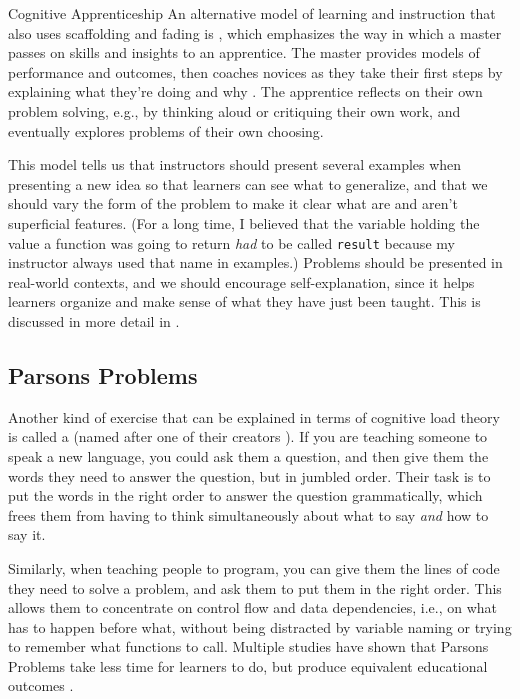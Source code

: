 \begin{aside}{Cognitive Apprenticeship}
  An alternative model of learning and instruction that also uses
  scaffolding and fading is
  ,
  which emphasizes the way in which a master passes on skills and
  insights to an apprentice. The master provides models of performance
  and outcomes, then coaches novices as they take their first steps by
  explaining what they're doing and why \cite{Coll1991,Casp2007}. The
  apprentice reflects on their own problem solving, e.g., by thinking
  aloud or critiquing their own work, and eventually explores problems
  of their own choosing.

  This model tells us that instructors should present several examples
  when presenting a new idea so that learners can see what to
  generalize, and that we should vary the form of the problem to make it
  clear what are and aren't superficial features. (For a long time, I
  believed that the variable holding the value a function was going to
  return \emph{had} to be called \texttt{result} because my instructor always used
  that name in examples.) Problems should be presented in real-world
  contexts, and we should encourage self-explanation, since it helps
  learners organize and make sense of what they have just been taught.
  This is discussed in more detail in
  .
\end{aside}

\subsection*{Parsons Problems}

Another kind of exercise that can be explained in terms of cognitive
load theory is called a 
(named after one of their creators \cite{Pars2006}). If you are
teaching someone to speak a new language, you could ask them a question,
and then give them the words they need to answer the question, but in
jumbled order. Their task is to put the words in the right order to
answer the question grammatically, which frees them from having to think
simultaneously about what to say \emph{and} how to say it.

Similarly, when teaching people to program, you can give them the lines
of code they need to solve a problem, and ask them to put them in the
right order. This allows them to concentrate on control flow and data
dependencies, i.e., on what has to happen before what, without being
distracted by variable naming or trying to remember what functions to
call. Multiple studies have shown that Parsons Problems take less time
for learners to do, but produce equivalent educational outcomes
\cite{Eric2017}.

